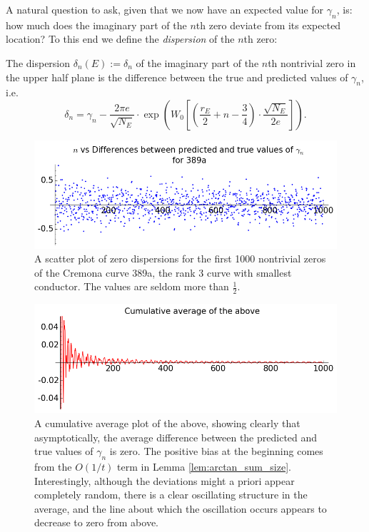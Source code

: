 A natural question to ask, given that we now have an expected value for $\gamma_n$, is: how much does the imaginary part of the $n$th zero deviate from its expected location? To this end we define the {\it dispersion} of the $n$th zero:
\begin{definition}
The dispersion $\delta_n(E) := \delta_n$ of the imaginary part of the $n$th nontrivial zero in the upper half plane is the difference between the true and predicted values of $\gamma_n$, i.e.
\begin{equation}
\delta_n = \gamma_n - \frac{2\pi e}{\sqrt{N_E}} \cdot \exp \left(W_0\left[\left(\frac{r_E}{2} +n - \frac{3}{4}\right)\cdot \frac{\sqrt{N_E}}{2 e}\right]\right).
\end{equation}
\end{definition}

\begin{figure}[!h]
    \centering
    \includegraphics[width=1.0\textwidth]{graphics/389a_zero_dispersions_scatterplot.png}
    \caption{A scatter plot of zero dispersions for the first 1000 nontrivial zeros of the Cremona curve 389a, the rank 3 curve with smallest conductor. The values are seldom more than $\frac{1}{2}$.}
    \label{fig:389a_zero_dispersions_scatterplot}
\end{figure}

\begin{figure}[!h]
    \centering
    \includegraphics[width=1.0\textwidth]{graphics/389a_zero_dispersions_cumulative_average.png}
    \caption{A cumulative average plot of the above, showing clearly that asymptotically, the average difference between the predicted and true values of $\gamma_n$ is zero. The positive bias at the beginning comes from the $O(1/t)$ term in Lemma \ref{lem:arctan_sum_size}. Interestingly, although the deviations might a priori appear completely random, there is a clear oscillating structure in the average, and the line about which the oscillation occurs appears to decrease to zero from above.}
    \label{fig:zero_dispersions_cumulative_average}
\end{figure}

